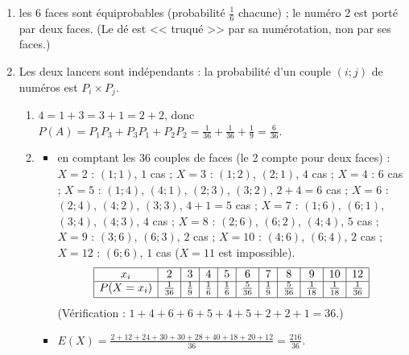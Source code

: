 	\begin{enumerate}
		\item {}
			les $6$ faces sont équiprobables (probabilité $\frac{1}{6}$ chacune) ; le numéro 2 est porté par deux faces.
			(Le dé est << truqué >> par sa numérotation, non par ses faces.)

		\item Les deux lancers sont indépendants : la probabilité d'un couple $(i;j)$ de numéros est $P_i \times P_j$.
			\begin{enumerate}
				\item {}
					$4 = 1 + 3 = 3 + 1 = 2 + 2$, donc
					$P(A) = P_1P_3 + P_3P_1 + P_2P_2 = \frac{1}{36} + \frac{1}{36} + \frac{1}{9} = \frac{6}{36}$.

				\item \begin{itemize}
					\item {}
						en comptant les $36$ couples de faces (le 2 compte pour deux faces) :
						$X = 2$ : $(1;1)$, $1$ cas ; $X = 3$ : $(1;2)$, $(2;1)$, $4$ cas ; $X = 4$ : $6$ cas ;
						$X = 5$ : $(1;4)$, $(4;1)$, $(2;3)$, $(3;2)$, $2 + 4 = 6$ cas ; $X = 6$ : $(2;4)$, $(4;2)$, $(3;3)$, $4 + 1 = 5$ cas ;
						$X = 7$ : $(1;6)$, $(6;1)$, $(3;4)$, $(4;3)$, $4$ cas ; $X = 8$ : $(2;6)$, $(6;2)$, $(4;4)$, $5$ cas ;
						$X = 9$ : $(3;6)$, $(6;3)$, $2$ cas ; $X = 10$ : $(4;6)$, $(6;4)$, $2$ cas ; $X = 12$ : $(6;6)$, $1$ cas
						($X = 11$ est impossible).
						\[
						\begin{array}{|c|c|c|c|c|c|c|c|c|c|c|}
							\hline
							x_i & 2 & 3 & 4 & 5 & 6 & 7 & 8 & 9 & 10 & 12 \\ \hline
							P(X=x_i) & \frac{1}{36} & \frac{1}{9} & \frac{1}{6} & \frac{1}{6} & \frac{5}{36} & \frac{1}{9} & \frac{5}{36} & \frac{1}{18} & \frac{1}{18} & \frac{1}{36} \\[.5ex] \hline
						\end{array}
						\]
						(Vérification : $1 + 4 + 6 + 6 + 5 + 4 + 5 + 2 + 2 + 1 = 36$.)
					\item {}
						$E(X) = \frac{2 + 12 + 24 + 30 + 30 + 28 + 40 + 18 + 20 + 12}{36} = \frac{216}{36}$.



\end{itemize}
\end{enumerate}
\end{enumerate}
